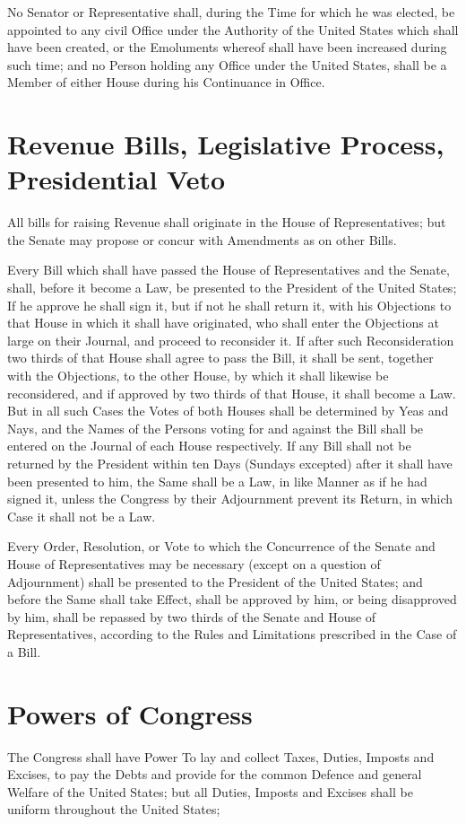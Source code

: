 \documentclass{constitution}
\begin{document}
No Senator or Representative shall, during the Time for which he was elected, be appointed to any civil Office under the Authority of the United States which shall have been created, or the Emoluments whereof shall have been increased during such time;
and no Person holding any Office under the United States, shall be a Member of either House during his Continuance in Office.

\section{Revenue Bills, Legislative Process, Presidential Veto}
All bills for raising Revenue shall originate in the House of Representatives;
but the Senate may propose or concur with Amendments as on other Bills.

Every Bill which shall have passed the House of Representatives and the Senate, shall, before it become a Law, be presented to the President of the United States;
If he approve he shall sign it,
but if not he shall return it, with his Objections to that House in which it shall have originated,
who shall enter the Objections at large on their Journal, and proceed to reconsider it.
If after such Reconsideration two thirds of that House shall agree to pass the Bill,
it shall be sent, together with the Objections, to the other House, by which it shall likewise be reconsidered,
and if approved by two thirds of that House, it shall become a Law.
But in all such Cases the Votes of both Houses shall be determined by Yeas and Nays,
and the Names of the Persons voting for and against the Bill shall be entered on the Journal of each House respectively.
If any Bill shall not be returned by the President within ten Days (Sundays excepted) after it shall have been presented to him,
the Same shall be a Law, in like Manner as if he had signed it,
unless the Congress by their Adjournment prevent its Return,
in which Case it shall not be a Law.

Every Order, Resolution, or Vote to which the Concurrence of the Senate and House of Representatives may be necessary (except on a question of Adjournment) shall be presented to the President of the United States;
and before the Same shall take Effect, shall be approved by him,
or being disapproved by him, shall be repassed by two thirds of the Senate and House of Representatives,
according to the Rules and Limitations prescribed in the Case of a Bill.

\section{Powers of Congress}
The Congress shall have Power
To lay and collect Taxes, Duties, Imposts and Excises,
to pay the Debts and provide for the common Defence and general Welfare of the United States;
but all Duties, Imposts and Excises shall be uniform throughout the United States;
\end{document}
